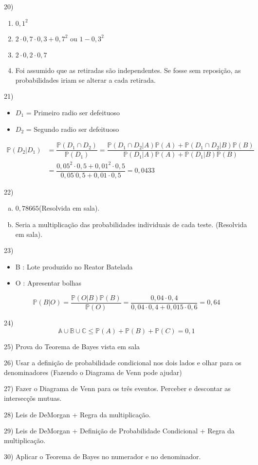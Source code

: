 \documentclass{article}
\begin{document}
20) \begin{enumerate}
    \item $0,1^2$
    \item $2 \cdot 0,7 \cdot 0,3 + 0,7^2$ ou $1- 0,3^2$
    \item $2 \cdot 0,2 \cdot 0,7$
    \item Foi assumido que as retiradas são independentes. Se fosse sem reposição, as probabilidades iriam se alterar a cada retirada. 
\end{enumerate}

21) \begin{itemize}
    \item $D_1$ = Primeiro radio ser defeituoso
    \item  $D_2$ = Segundo radio ser defeituoso
\end{itemize}

\begin{align*}
  \mathds{P}(D_2|D_1)  &= \dfrac{\mathds{P}(D_1 \cap D_2)}{\mathds{P}(D_1)} =  \dfrac{\mathds{P}(D_1 \cap D_2 | A) \mathds{P}(A) + \mathds{P}(D_1 \cap D_2 | B) \mathds{P}(B)}{\mathds{P}(D_1|A)\mathds{P}(A) + \mathds{P}(D_1|B)\mathds{P}(B)}\\
  &=  \dfrac{0,05^2 \cdot 0,5 + 0,01^2 \cdot 0,5}{0,05^\cdot 0,5 + 0,01 \cdot 0,5} = 0,0433
\end{align*}

22) 

\begin{enumerate}[a)]
    \item $0,78665$(Resolvida em sala).
    \item Seria a multiplicação das probabilidades individuais de cada teste. (Resolvida em sala). 
\end{enumerate}

23) \begin{itemize}
    \item B : Lote produzido no Reator Batelada
    \item O : Apresentar bolhas
\end{itemize} 

$$\mathds{P}(B|O) = \dfrac{\mathds{P}(O|B)\mathds{P}(B)}{\mathds{P}(O)} = \dfrac{0,04 \cdot 0,4}{0,04 \cdot 0,4 + 0,015 \cdot 0,6} = 0,64 $$

24) $$\mathds{A \cup B \cup C} \leq \mathds{P}(A) + \mathds{P}(B) + \mathds{P}(C) = 0,1$$

25) Prova do Teorema de Bayes vista em sala

26) Usar a definição de probabilidade condicional nos dois lados e olhar para os denominadores (Fazendo o Diagrama de Venn pode ajudar)

27) Fazer o Diagrama de Venn para os três eventos. Perceber e descontar as intersecçõs mutuas. 

28) Leis de DeMorgan + Regra da multiplicação.

29) Leis de DeMorgan + Definição de Probabilidade Condicional + Regra da multiplicação. 

30) Aplicar o Teorema de Bayes no numerador e no denominador. 
 
\end{document}
